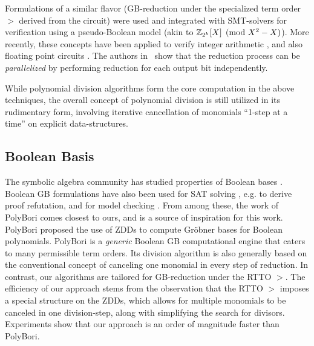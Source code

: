 Formulations of a similar flavor (GB-reduction under the
specialized term order $>$ derived from the circuit) were used
and integrated with SMT-solvers \cite{wedler:date11} for verification
using a pseudo-Boolean model (akin to ${\mathbb{Z}}_{2^k}[X] \pmod{X^2-X}$). More
recently, these concepts have been applied to verify integer
arithmetic \cite{ciesielski:dac2015,rolf:date16,Armin2017ColumnWiseVO}, 
and also floating point circuits \cite{rolf:fmcad17}. The authors
in~\cite{cunxi:aspdac17} show that the reduction process can be
{\it parallelized} by performing reduction for each output bit
independently.   

While polynomial division algorithms form the core computation in the above
techniques, 
the overall concept of polynomial
division is still utilized in its rudimentary form, involving
iterative cancellation of monomials ``1-step at a time'' on explicit
data-structures. 


\subsection{Boolean \Grobner Basis} 
The symbolic algebra community 
has studied properties of Boolean \Grobner bases 
\cite{michon:bool-ring2006} \cite{polybori:2009}. Boolean GB
formulations have also been used for SAT solving \cite{CEI:stoc-96},
e.g. to derive proof refutation, and for  model checking
\cite{Avrunin:CAV} \cite{vardi-iasted07}. From among these, the work
of PolyBori \cite{polybori:2009} comes closest to ours, and is a
source of inspiration for this work. PolyBori proposed the use of
ZDDs to compute Gr\"obner bases for Boolean polynomials. PolyBori is
a {\it generic} Boolean GB computational engine that caters to many
permissible term orders. Its division algorithm is also generally
based on the conventional concept of canceling one monomial in every
step of reduction. In contrast, our algorithms are tailored for
GB-reduction under the RTTO $>$. The efficiency of our approach stems
from the observation that the RTTO $>$ imposes a special structure on
the ZDDs, which allows for multiple monomials to be canceled in one
division-step, along with simplifying the search for
divisors. Experiments show that our approach is an order of magnitude
faster than PolyBori. 


